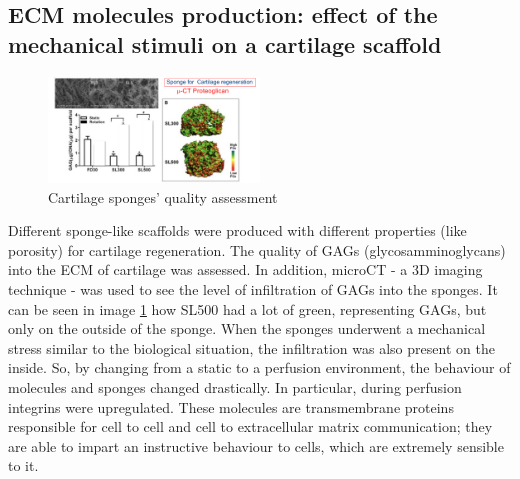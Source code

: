	\subsection{ECM molecules production: effect of the mechanical stimuli on a cartilage scaffold}

	\begin{figure}[ht]
		\centering
		\includegraphics[width=0.5\textwidth]{sponge_cart.png}
		\caption{Cartilage sponges' quality assessment}
		\label{fig:sponge_c}
	\end{figure}

	Different sponge-like scaffolds were produced with different properties (like porosity) for cartilage regeneration.
	The quality of GAGs (glycosamminoglycans) into the ECM of cartilage was assessed.
	In addition, microCT - a 3D imaging technique - was used to see the level of infiltration of GAGs into the sponges.
	It can be seen in image \ref{fig:sponge_c} how SL500 had a lot of green, representing GAGs, but only on the outside of the sponge.
	When the sponges underwent a mechanical stress similar to the biological situation, the infiltration was also present on the inside.
	So, by changing from a static to a perfusion environment, the behaviour of molecules and sponges changed drastically.
	In particular, during perfusion integrins were upregulated.
	These molecules are transmembrane proteins responsible for cell to cell and cell to extracellular matrix communication; they are able to impart an instructive behaviour to cells, which are extremely sensible to it.
